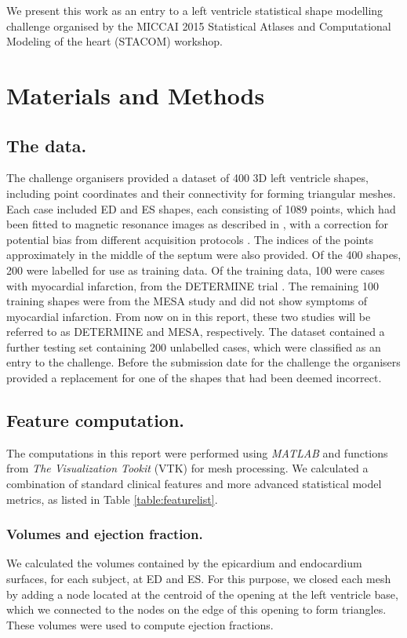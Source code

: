 \documentclass{llncs}
\begin{document}
We present this work as an entry to a left ventricle statistical shape modelling challenge organised by the MICCAI 2015 Statistical Atlases and Computational Modeling of the heart (STACOM) workshop.


\section{Materials and Methods}
	\subsection{The data.}
The challenge organisers provided a dataset of 400 3D left ventricle shapes, including point coordinates and their connectivity for forming triangular meshes. Each case included ED and ES shapes, each consisting of 1089 points, which had been fitted to magnetic resonance images as described in \cite{Young2000}, with a correction for potential bias from different acquisition protocols \cite{Medrano-Gracia2013}. The indices of the points approximately in the middle of the septum were also provided. Of the 400 shapes, 200 were labelled for use as training data. Of the training data, 100 were cases with myocardial infarction, from the DETERMINE trial \cite{Kadish2009}. The remaining 100 training shapes were from the MESA study \cite{Bild2002} and did not show symptoms of myocardial infarction. From now on in this report, these two studies will be referred to as DETERMINE and MESA, respectively. The dataset contained a further testing set containing 200 unlabelled cases, which were classified as an entry to the challenge. Before the submission date for the challenge the organisers provided a replacement for one of the shapes that had been deemed incorrect. 
	\subsection{Feature computation.}
	The computations in this report were performed using \emph{\mbox{MATLAB}} and functions from  \emph{The Visualization Tookit} (VTK) \cite{Schroeder2006visualization} for mesh processing. We calculated a combination of standard clinical features and more advanced statistical model metrics, as listed in Table \ref{table:featurelist}.
	\subsubsection{Volumes and ejection fraction.}
We calculated the volumes contained by the epicardium and endocardium surfaces, for each subject, at ED and ES. For this purpose, we closed each mesh by adding a node located at the centroid of the opening at the left ventricle base, which we connected to the nodes on the edge of this opening to form triangles. These volumes were used to compute ejection fractions. 
\end{document}
